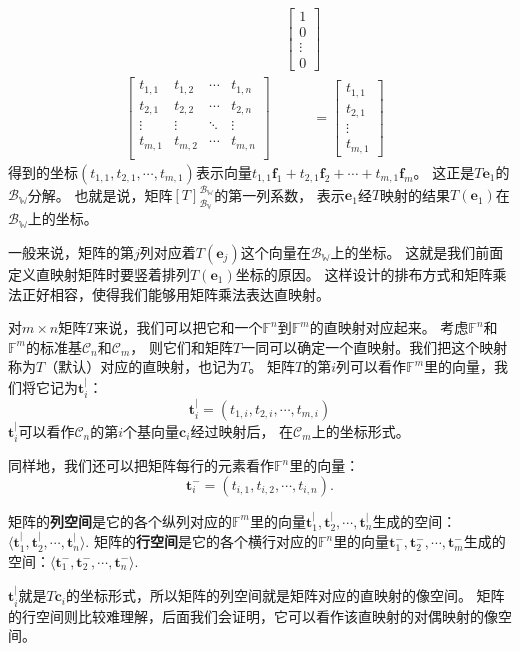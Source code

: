 \documentclass[12pt,UTF8]{ctexbook}
\begin{document}
\begin{align*}
    & \begin{bmatrix}1\\ 0 \\ \vdots \\0 \end{bmatrix} &  \\
        \begin{bmatrix}
            t_{1,1}    & t_{1,2}   & \cdots & t_{1,n} \\
            t_{2,1}    & t_{2,2}   & \cdots & t_{2,n} \\
            \vdots     & \vdots    & \ddots & \vdots  \\
            t_{m,1}    & t_{m,2}   & \cdots & t_{m,n} \\
           \end{bmatrix} \,& \quad\quad = \begin{bmatrix} t_{1,1}\\ t_{2,1}\\ \vdots \\ t_{m,1} \end{bmatrix} 
\end{align*}
得到的坐标$(t_{1,1},  t_{2,1},  \cdots , t_{m,1})$表示向量$ t_{1,1}\mathbf{f}_1 + t_{2,1}\mathbf{f}_2 + \cdots + t_{m,1}\mathbf{f}_m$。
这正是$ T\mathbf{e}_1$的$\mathcal{B}_{\mathbb{W}}$分解。
也就是说，矩阵$[T]_{\mathcal{B}_{\mathbb{V}}}^{\mathcal{B}_{\mathbb{W}}}$的第一列系数，
表示$\mathbf{e}_1$经$T$映射的结果$T(\mathbf{e}_1)$在$\mathcal{B}_{\mathbb{W}}$上的坐标。

一般来说，矩阵的第$j$列对应着$T(\mathbf{e}_j)$这个向量在$\mathcal{B}_{\mathbb{W}}$上的坐标。
这就是我们前面定义直映射矩阵时要竖着排列$T(\mathbf{e}_1)$坐标的原因。
这样设计的排布方式和矩阵乘法正好相容，使得我们能够用矩阵乘法表达直映射。

对$m \times n$矩阵$T$来说，我们可以把它和一个$\mathbb{F}^n$到$\mathbb{F}^m$的直映射对应起来。
考虑$\mathbb{F}^n$和$\mathbb{F}^m$的标准基$\mathcal{C}_{n}$和$\mathcal{C}_{m}$，
则它们和矩阵$T$一同可以确定一个直映射。我们把这个映射称为$T$（默认）对应的直映射，也记为$T$。
矩阵$T$的第$i$列可以看作$\mathbb{F}^m$里的向量，我们将它记为$\mathbf{t}_i^|$：
$$\mathbf{t}_i^| = (t_{1,i}, t_{2,i}, \cdots, t_{m,i})$$
$\mathbf{t}_i^|$可以看作$\mathcal{C}_{n}$的第$i$个基向量$\mathbf{c}_i$经过映射后，
在$\mathcal{C}_{m}$上的坐标形式。

同样地，我们还可以把矩阵每行的元素看作$\mathbb{F}^n$里的向量：
$$ \mathbf{t}_i^- = (t_{i,1}, t_{i,2}, \cdots, t_{i,n}).$$
\begin{df}\label{df:4_1_0}
    矩阵的\textbf{列空间}是它的各个纵列对应的$\mathbb{F}^m$里的向量$\mathbf{t}_1^|, \mathbf{t}_2^|, \cdots , \mathbf{t}_n^|$生成的空间：$\langle \mathbf{t}_1^|, \mathbf{t}_2^|, \cdots , \mathbf{t}_n^| \rangle$. 
    矩阵的\textbf{行空间}是它的各个横行对应的$\mathbb{F}^n$里的向量$\mathbf{t}_1^-, \mathbf{t}_2^-, \cdots , \mathbf{t}_m^-$生成的空间：$\langle \mathbf{t}_1^-, \mathbf{t}_2^-, \cdots , \mathbf{t}_n^- \rangle$. 
\end{df}
$\mathbf{t}_i^|$就是$T\mathbf{c}_i$的坐标形式，所以矩阵的列空间就是矩阵对应的直映射的像空间。
矩阵的行空间则比较难理解，后面我们会证明，它可以看作该直映射的对偶映射的像空间。
\end{document}
